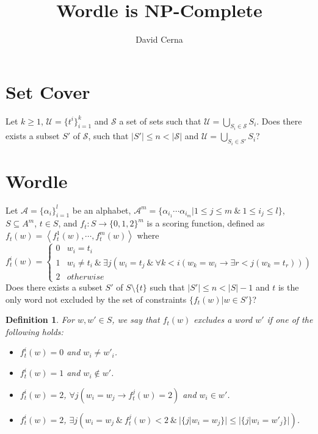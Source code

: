\documentclass[10pt,a4paper]{article}
\author{David Cerna}
\title{Wordle is NP-Complete}
\newtheorem{definition}{Definition}
\begin{document}
\maketitle
\section{Set Cover}
Let $k\geq 1$,  $\mathcal{U}= \{t^{i}\}^{k}_{i=1}$ and $\mathcal{S}$ a set of sets such that $\mathcal{U} =\bigcup_{S_i\in \mathcal{S}} S_i$. Does there exists a subset $S'$ of $\mathcal{S}$, such that $\vert S'\vert \leq n< \vert \mathcal{S}\vert$ and 
$\mathcal{U} =\bigcup_{S_i\in S'} S_i$?

\section{Wordle}
Let $\mathcal{A}= \{\alpha_{i}\}^{l}_{i=1}$ be an alphabet, $\mathcal{A}^{m} =\{ \alpha_{i_1}\cdots \alpha_{i_m}\vert 1\leq j\leq m\ \& \ 1\leq i_j\leq l\}$,  $S\subseteq A^m$, $t\in S$, and  $f_t:S\rightarrow \{0,1,2\}^m$ is a scoring function, defined as $f_t(w) = \left\langle f_t^1(w),\cdots, f_t^{m}(w)\right\rangle$ where
$$f_t^i(w) =\left\lbrace \begin{array}{cc}
0 &  w_i = t_i \\
1 & w_i \not = t_i\ \&\ \exists j(w_i = t_j \ \& \ \forall k< i(w_k =w_i \rightarrow \exists r< j (w_k=t_r)))\\
2 & otherwise
\end{array}\right.$$
Does there exists a subset $S'$ of $S\setminus \{t\}$ such that $\vert S'\vert \leq n< \vert S\vert-1 $ and $t$ is the only word not excluded by the set of constraints $\{f_t(w)\vert w\in S'\}$?

\begin{definition}
For $w,w'\in S$, we say that $f_t(w)$ excludes a word $w'$ if one of the following holds: 

\begin{itemize}
\item $f_t^i(w) = 0$ and $w_i\not= w'_i $. 
\item $f_t^i(w) = 1$ and $w_i \not \in w'$.
\item $f_t^i(w) = 2$, $\forall j( w_i = w_j\rightarrow f_t^j(w) = 2)$ and $w_i\in w'$.
\item $f_t^i(w) = 2$,  $\exists j( w_i = w_j \ \&\ f_t^j(w) < 2 \ \& \ \vert\{j\vert w_i=w_j\}\vert\leq \vert\{j\vert w_i=w'_j\}\vert)$.
\end{itemize}
\end{definition}
\end{document}
